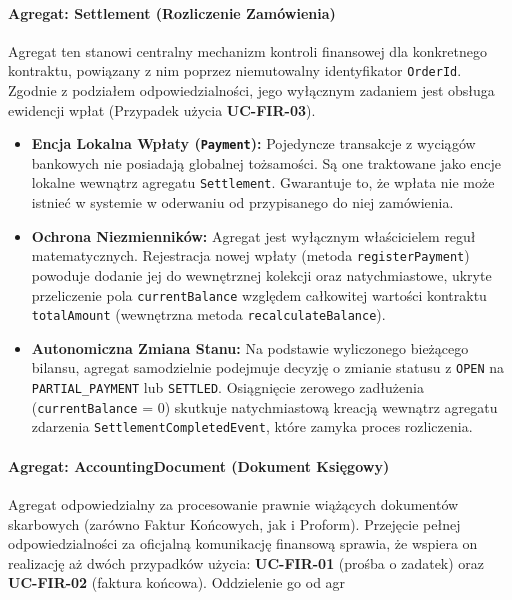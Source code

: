 \paragraph{Agregat: Settlement (Rozliczenie Zamówienia)}
Agregat ten stanowi centralny mechanizm kontroli finansowej dla konkretnego kontraktu, powiązany z nim poprzez niemutowalny identyfikator \texttt{OrderId}. Zgodnie z podziałem odpowiedzialności, jego wyłącznym zadaniem jest obsługa ewidencji wpłat (Przypadek użycia \textbf{UC-FIR-03}).
\begin{itemize}
    \item \textbf{Encja Lokalna Wpłaty (\texttt{Payment}):} Pojedyncze transakcje z wyciągów bankowych nie posiadają globalnej tożsamości. Są one traktowane jako encje lokalne wewnątrz agregatu \texttt{Settlement}. Gwarantuje to, że wpłata nie może istnieć w systemie w oderwaniu od przypisanego do niej zamówienia.
    \item \textbf{Ochrona Niezmienników:} Agregat jest wyłącznym właścicielem reguł matematycznych. Rejestracja nowej wpłaty (metoda \texttt{registerPayment}) powoduje dodanie jej do wewnętrznej kolekcji oraz natychmiastowe, ukryte przeliczenie pola \texttt{currentBalance} względem całkowitej wartości kontraktu \texttt{totalAmount} (wewnętrzna metoda \texttt{recalculateBalance}). 
    \item \textbf{Autonomiczna Zmiana Stanu:} Na podstawie wyliczonego bieżącego bilansu, agregat samodzielnie podejmuje decyzję o zmianie statusu z \texttt{OPEN} na \texttt{PARTIAL\_PAYMENT} lub \texttt{SETTLED}. Osiągnięcie zerowego zadłużenia (\texttt{currentBalance} = 0) skutkuje natychmiastową kreacją wewnątrz agregatu zdarzenia \texttt{SettlementCompletedEvent}, które zamyka proces rozliczenia.
\end{itemize}

\paragraph{Agregat: AccountingDocument (Dokument Księgowy)}
Agregat odpowiedzialny za procesowanie prawnie wiążących dokumentów skarbowych (zarówno Faktur Końcowych, jak i Proform). Przejęcie pełnej odpowiedzialności za oficjalną komunikację finansową sprawia, że wspiera on realizację aż dwóch przypadków użycia: \textbf{UC-FIR-01} (prośba o zadatek) oraz \textbf{UC-FIR-02} (faktura końcowa). Oddzielenie go od agr